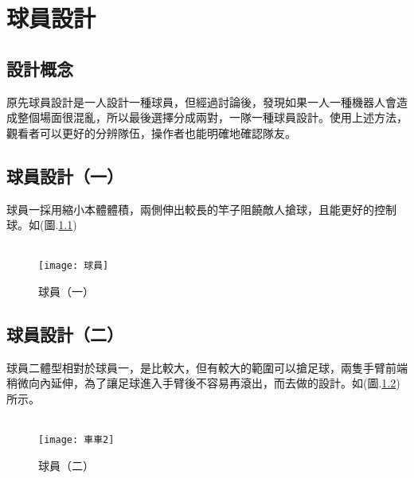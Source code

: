 \chapter{球員設計}
\section{設計概念}
    原先球員設計是一人設計一種球員，但經過討論後，發現如果一人一種機器人會造成整個場面很混亂，所以最後選擇分成兩對，一隊一種球員設計。使用上述方法，觀看者可以更好的分辨隊伍，操作者也能明確地確認隊友。\\[6pt]

\section{球員設計（一）}
    球員一採用縮小本體體積，兩側伸出較長的竿子阻饒敵人搶球，且能更好的控制球。如(圖.\ref{球員})\\[6pt]\\
\begin{figure}[hbt!]
\center
\texttt{[image: 球員]}
\caption{\Large 球員（一）}
\label{球員}
\end{figure}

\newpage
\section{球員設計（二）}
    球員二體型相對於球員一，是比較大，但有較大的範圍可以搶足球，兩隻手臂前端稍微向內延伸，為了讓足球進入手臂後不容易再滾出，而去做的設計。如(圖.\ref{車車2})所示。\\[6pt]\\
\begin{figure}[hbt!]
\center
\texttt{[image: 車車2]}
\caption{\Large 球員（二）}
\label{車車2}
\end{figure}